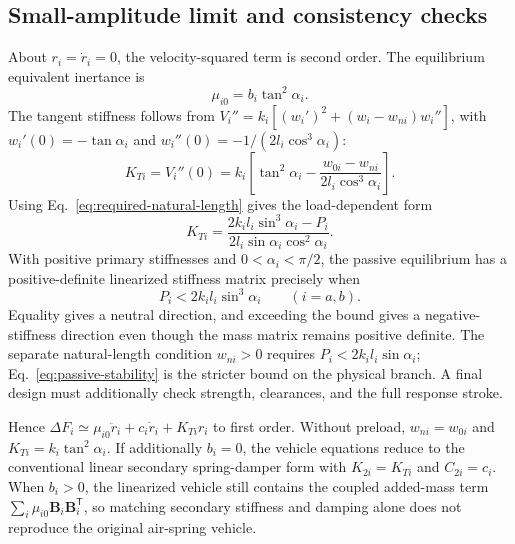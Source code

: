 \documentclass[a4paper,12pt]{article}
\numberwithin{equation}{section}
\newcommand{\vect}[1]{\boldsymbol{#1}}
\begin{document}
\subsection{Small-amplitude limit and consistency checks}
\label{sec:stability-conditioning}
About $r_i=\dot r_i=0$, the velocity-squared term is second order. The equilibrium equivalent inertance is
\begin{equation}
 \mu_{i0}=b_i\tan^2\alpha_i.
\end{equation}
The tangent stiffness follows from $V_i''=k_i[(w_i')^2+(w_i-w_{ni})w_i'']$, with $w_i'(0)=-\tan\alpha_i$ and $w_i''(0)=-1/(2l_i\cos^3\alpha_i)$:
\begin{equation}
 K_{Ti}=V_i''(0)
 =k_i\left[\tan^2\alpha_i
 -\frac{w_{0i}-w_{ni}}{2l_i\cos^3\alpha_i}\right].
 \label{eq:tangent-stiffness}
\end{equation}
Using Eq.~\eqref{eq:required-natural-length} gives the load-dependent form
\begin{equation}
K_{Ti}=\frac{2k_i l_i\sin^3\alpha_i-P_i}
              {2l_i\sin\alpha_i\cos^2\alpha_i}.
\label{eq:loaded-tangent-stiffness}
\end{equation}
With positive primary stiffnesses and $0<\alpha_i<\pi/2$, the passive equilibrium has a positive-definite linearized stiffness matrix precisely when
\begin{equation}
P_i<2k_i l_i\sin^3\alpha_i
\qquad (i=a,b).
\label{eq:passive-stability}
\end{equation}
Equality gives a neutral direction, and exceeding the bound gives a negative-stiffness direction even though the mass matrix remains positive definite. The separate natural-length condition $w_{ni}>0$ requires $P_i<2k_i l_i\sin\alpha_i$; Eq.~\eqref{eq:passive-stability} is the stricter bound on the physical branch. A final design must additionally check strength, clearances, and the full response stroke.

Hence $\Delta F_i\simeq\mu_{i0}\ddot r_i+c_i\dot r_i+K_{Ti}r_i$ to first order. Without preload, $w_{ni}=w_{0i}$ and $K_{Ti}=k_i\tan^2\alpha_i$. If additionally $b_i=0$, the vehicle equations reduce to the conventional linear secondary spring-damper form with $K_{2i}=K_{Ti}$ and $C_{2i}=c_i$. When $b_i>0$, the linearized vehicle still contains the coupled added-mass term $\sum_i\mu_{i0}\vect B_i\vect B_i^{\mathsf T}$, so matching secondary stiffness and damping alone does not reproduce the original air-spring vehicle.
\end{document}
